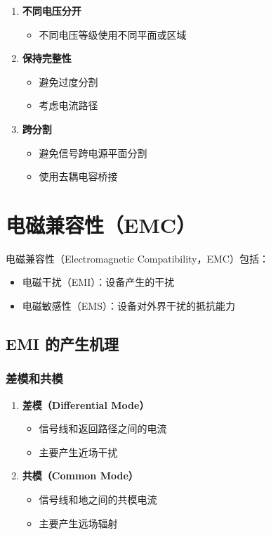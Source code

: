 \begin{enumerate}
  \item \textbf{不同电压分开}
    \begin{itemize}
      \item 不同电压等级使用不同平面或区域
    \end{itemize}

  \item \textbf{保持完整性}
    \begin{itemize}
      \item 避免过度分割
      \item 考虑电流路径
    \end{itemize}

  \item \textbf{跨分割}
    \begin{itemize}
      \item 避免信号跨电源平面分割
      \item 使用去耦电容桥接
    \end{itemize}
\end{enumerate}

\section{电磁兼容性（EMC）}

电磁兼容性（Electromagnetic Compatibility，EMC）包括：
\begin{itemize}
  \item 电磁干扰（EMI）：设备产生的干扰
  \item 电磁敏感性（EMS）：设备对外界干扰的抵抗能力
\end{itemize}

\subsection{EMI 的产生机理}

\subsubsection{差模和共模}

\begin{enumerate}
  \item \textbf{差模（Differential Mode）}
    \begin{itemize}
      \item 信号线和返回路径之间的电流
      \item 主要产生近场干扰
    \end{itemize}

  \item \textbf{共模（Common Mode）}
    \begin{itemize}
      \item 信号线和地之间的共模电流
      \item 主要产生远场辐射
    \end{itemize}
\end{enumerate}

